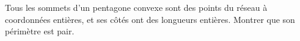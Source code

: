Tous les sommets d'un pentagone convexe sont des points du réseau à coordonnées entières, et ses côtés ont des longueurs entières. Montrer que son périmètre est pair.
